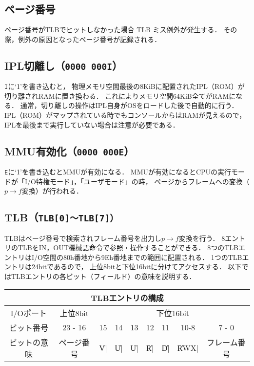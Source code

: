 \subsection{ページ番号}
  ページ番号がTLBでヒットしなかった場合 TLB ミス例外が発生する．
  その際，例外の原因となったページ番号が記録される．

\subsection{IPL切離し（\texttt{0000 000I}）}
  \texttt{I}に`1'を書き込むと，
  物理メモリ空間最後の8KiBに配置されたIPL（ROM）が切り離されRAMに置き換わる．
  これによりメモリ空間64KiB全てがRAMになる．
  通常，切り離しの操作はIPL自身がOSをロードした後で自動的に行う．
  IPL（ROM）がマップされている時でもコンソールからはRAMが見えるので，
  IPLを最後まで実行していない場合は注意が必要である．

\subsection{MMU有効化（\texttt{0000 000E}）}
  \texttt{E}に`1'を書き込むとMMUが有効になる．
  MMUが有効になるとCPUの実行モードが「I/O特権モード」，「ユーザモード」の時，
  ページからフレームへの変換（$p \to f$変換）が行われる．

\subsection{TLB（\texttt{TLB[0]〜TLB[7]）}}
  TLBはページ番号で検索されフレーム番号を出力し$p \to f$変換を行う．
  8エントリのTLBをIN，OUT機械語命令で参照・操作することができる．
  8つのTLBエントリはI/O空間の80h番地から9Eh番地までの範囲に配置される．
  1つのTLBエントリは24bitであるので，
  上位8bitと下位16bitに分けてアクセスする．
  以下ではTLBエントリの各ビット（フィールド）の意味を説明する．

  \begin{center}
  \small\begin{tabular}{| c || c |c|c|c|c|c|c| c |}\hline
    \multicolumn{9}{|c|}{TLBエントリの構成} \\\hline
    I/Oポート   &上位8bit&\multicolumn{7}{|c|}{下位16bit} \\\hline
    ビット番号  &23 - 16&15&14&13&12&11&10-8&7 - 0      \\\hline
    ビットの意味& ページ番号&
    \|V|&\|U|&\|U|&\|R|&\|D|&\|RWX|&フレーム番号\\\hline
  \end{tabular}
  \end{center}

